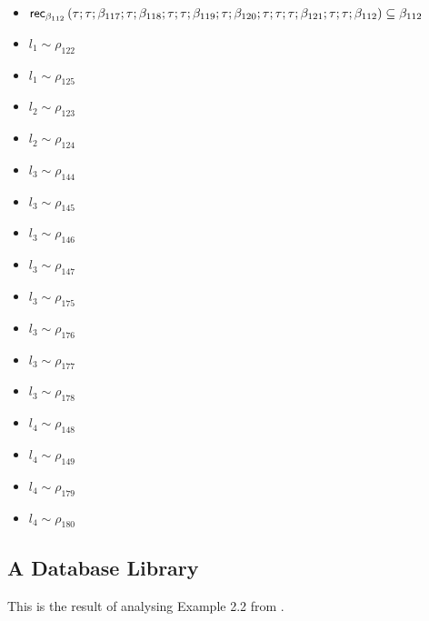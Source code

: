 \documentclass{article}
\begin{document}
\begin{itemize}
\item $ \orec{ (\tau; \tau; \beta_{117}; \tau; \beta_{118}; \tau; \tau; \beta_{119}; \tau; \beta_{120}; \tau; \tau; \tau; \beta_{121}; \tau; \tau; \beta_{112})}{\beta_{112}} \subseteq \beta_{112} $
\item $ l_{1} \sim\rho_{122} $
\item $ l_{1} \sim\rho_{125} $
\item $ l_{2} \sim\rho_{123} $
\item $ l_{2} \sim\rho_{124} $
\item $ l_{3} \sim\rho_{144} $
\item $ l_{3} \sim\rho_{145} $
\item $ l_{3} \sim\rho_{146} $
\item $ l_{3} \sim\rho_{147} $
\item $ l_{3} \sim\rho_{175} $
\item $ l_{3} \sim\rho_{176} $
\item $ l_{3} \sim\rho_{177} $
\item $ l_{3} \sim\rho_{178} $
\item $ l_{4} \sim\rho_{148} $
\item $ l_{4} \sim\rho_{149} $
\item $ l_{4} \sim\rho_{179} $
\item $ l_{4} \sim\rho_{180} $
\end{itemize}


\subsection{A Database Library}
This is the result of analysing Example 2.2 from \cite{forte}.
\end{document}
